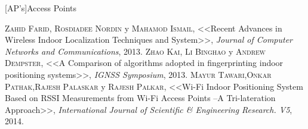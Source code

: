 \documentclass[letterpaper,oneside,12pt]{book}
\begin{document}
[AP's]{Access Points}


\begin{acronym}

\end{acronym}

%
%

\newpage
\pagestyle{fancy} 	%


 
\newpage



%

%


\newpage
%


 \newpage
 
 
\begin{thebibliography}{X}

 \textsc{Zahid Farid, Rosdiadee Nordin} y \textsc{Mahamod Ismail}, <<Recent Advances in Wireless Indoor Localization Techniques
and System>>, \textit{Journal of Computer Networks and Communications}, 2013.
 \textsc{Zhao Kai, Li Binghao} y \textsc{Andrew Dempster}, <<A Comparison of algorithms adopted in fingerprinting indoor positioning systems>>, \textit{IGNSS Symposium}, 2013.
 \textsc{Mayur Tawari},\textsc{Onkar Pathak},\textsc{Rajesh Palaskar} y \textsc{Rajesh Palkar}, <<Wi-Fi Indoor Positioning System
Based on RSSI Measurements from Wi-Fi Access Points –A Tri-lateration Approach>>, \textit{International Journal of Scientific \& Engineering Research. V5}, 2014.
\end{thebibliography}


\end{document}
